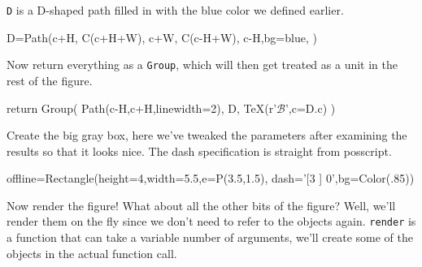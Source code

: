 \documentclass[a4paper]{book}
\begin{document}
\Verb|D| is a D-shaped path filled in with the blue color we defined earlier.
\begin{python}
    D=Path(c+H,
           C(c+H+W),
           c+W,
           C(c-H+W),
           c-H,bg=blue,
           )
\end{python}
Now return everything as a \Verb|Group|, which will then get treated as a unit 
in the rest of the figure.
\begin{python}
    return Group(
        Path(c-H,c+H,linewidth=2),
        D,
        TeX(r'$\mathcal{B}$',c=D.c)
        )
\end{python}
Create the big gray box, here we've tweaked the parameters after
examining the results so that it looks nice. The dash specification is
straight from posscript.
\begin{python}
offline=Rectangle(height=4,width=5.5,e=P(3.5,1.5),
                  dash='[3 ] 0',bg=Color(.85))
\end{python}
Now render the figure! What about all the other bits of the figure?
Well, we'll render them on the fly since we don't need to refer to the
objects again. \Verb|render| is a function that can take a variable
number of arguments, we'll create some of the objects in the
actual function call.
\end{document}
